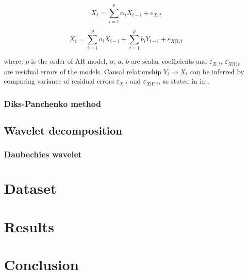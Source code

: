 \begin{equation}
X_t = \sum_{i=1}^{p} \alpha_i X_{t-i} + \varepsilon_{X,t}
\end{equation}

\begin{equation}
X_t = \sum_{i=1}^{p} a_i X_{t-i} + \sum_{i=1}^{p} b_i Y_{t-i} + \varepsilon_{X|Y,t}
\end{equation}

where: $p$ is the order of AR model, $\alpha$, $a$, $b$ are scalar coefficients and $\varepsilon_{X,t}$, $\varepsilon_{X|Y,t}$ are residual errors of the models.
Causal relationship $Y_t \Rightarrow X_t$ can be inferred by comparing variance of residual errors $\varepsilon_{X,t}$ and $\varepsilon_{X|Y,t}$, as stated in  in .



\subsubsection{Diks-Panchenko method}

\subsection{Wavelet decomposition}
\subsubsection{Daubechies wavelet}

\section{Dataset} \label{sec:data}

\section{Results} \label{sec:results}

\section{Conclusion} \label{sec:conclusion}

